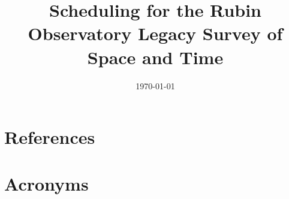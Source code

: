 \documentclass[modern]{aastex62}
\begin{document}

\date{\today}
\title{Scheduling for the Rubin Observatory Legacy Survey of Space and Time}





\appendix
%
\section{References} \label{sec:bib}



\section{Acronyms} \label{sec:acronyms}

\end{document}
